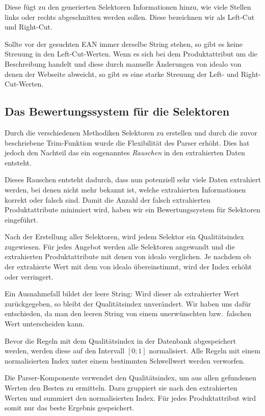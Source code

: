 Diese fügt zu den generierten Selektoren Informationen hinzu, wie viele Stellen links oder rechts abgeschnitten werden
sollen.
Diese bezeichnen wir als Left-Cut und Right-Cut.

Sollte vor der gesuchten EAN immer derselbe String stehen, so gibt es keine Streuung in den Left-Cut-Werten.
Wenn es sich bei dem Produktattribut um die Beschreibung handelt und diese durch manuelle Änderungen von idealo von
denen der Webseite abweicht, so gibt es eine starke Streuung der Left- und Right-Cut-Werten.

\subsection{Das Bewertungssystem für die Selektoren}
\label{subsec:bewertungssystem}

Durch die verschiedenen Methodiken Selektoren zu erstellen und durch die zuvor beschriebene Trim-Funktion wurde die
Flexibilität des Parser erhöht.
Dies hat jedoch den Nachteil das ein sogenanntes \textit{Rauschen} in den extrahierten Daten entsteht.

Dieses Rauschen entsteht dadurch, dass nun potenziell sehr viele Daten extrahiert werden, bei denen nicht mehr bekannt
ist, welche extrahierten Informationen korrekt oder falsch sind.
Damit die Anzahl der falsch extrahierten Produktattribute minimiert wird, haben wir ein Bewertungssystem für
Selektoren eingeführt.

Nach der Erstellung aller Selektoren, wird jedem Selektor ein Qualitätsindex zugewiesen.
Für jedes Angebot werden alle Selektoren angewandt und die extrahierten Produktattribute mit denen von idealo
verglichen.
Je nachdem ob der extrahierte Wert mit dem von idealo übereinstimmt, wird der Index erhöht oder verringert.

Ein Ausnahmefall bildet der leere String: Wird dieser als extrahierter Wert zurückgegeben, so bleibt der
Qualitätsindex unverändert.
Wir haben uns dafür entschieden, da man den leeren String von einem unerwünschten bzw.\  falschen Wert unterscheiden
kann.

Bevor die Regeln mit dem Qualitätsindex in der Datenbank abgespeichert werden, werden diese auf den Intervall $[0; 1]$
normalisiert.
Alle Regeln mit einem normalisierten Index unter einem bestimmten Schwellwert werden verworfen.

Die Parser-Komponente verwendet den Qualitätsindex, um aus allen gefundenen Werten den Besten zu ermitteln.
Dazu gruppiert sie nach den extrahierten Werten und summiert den normalisierten Index.
Für jedes Produktattribut wird somit nur das beste Ergebnis gespeichert.